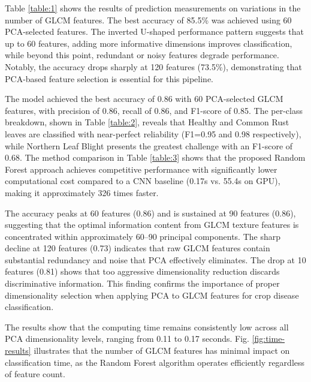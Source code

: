 \documentclass[10pt,a4paper]{article}
\begin{document}
Table \ref{table:1} shows the results of prediction measurements on variations in the number of GLCM features. The best accuracy of 85.5\% was achieved using 60 PCA-selected features. The inverted U-shaped performance pattern suggests that up to 60 features, adding more informative dimensions improves classification, while beyond this point, redundant or noisy features degrade performance. Notably, the accuracy drops sharply at 120 features (73.5\%), demonstrating that PCA-based feature selection is essential for this pipeline.

The model achieved the best accuracy of 0.86 with 60 PCA-selected GLCM features, with precision of 0.86, recall of 0.86, and F1-score of 0.85. The per-class breakdown, shown in Table \ref{table:2}, reveals that Healthy and Common Rust leaves are classified with near-perfect reliability (F1=0.95 and 0.98 respectively), while Northern Leaf Blight presents the greatest challenge with an F1-score of 0.68. The method comparison in Table \ref{table:3} shows that the proposed Random Forest approach achieves competitive performance with significantly lower computational cost compared to a CNN baseline (0.17s vs. 55.4s on GPU), making it approximately 326 times faster.

The accuracy peaks at 60 features (0.86) and is sustained at 90 features (0.86), suggesting that the optimal information content from GLCM texture features is concentrated within approximately 60–90 principal components. The sharp decline at 120 features (0.73) indicates that raw GLCM features contain substantial redundancy and noise that PCA effectively eliminates. The drop at 10 features (0.81) shows that too aggressive dimensionality reduction discards discriminative information. This finding confirms the importance of proper dimensionality selection when applying PCA to GLCM features for crop disease classification.


The results show that the computing time remains consistently low across all PCA dimensionality levels, ranging from 0.11 to 0.17 seconds. Fig. \ref{fig:time-results} illustrates that the number of GLCM features has minimal impact on classification time, as the Random Forest algorithm operates efficiently regardless of feature count.
\end{document}
